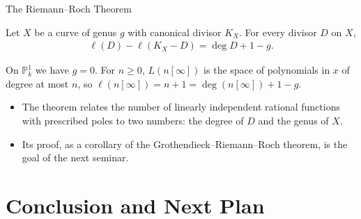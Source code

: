 \documentclass[10pt,aspectratio=1610]{beamer}
\newcommand{\PP}{\mathbb{P}}
\begin{document}
    \begin{frame}{The Riemann--Roch Theorem}
        \begin{theorem}
            Let $X$ be a curve of genus $g$ with canonical divisor $K_X$. For every divisor $D$ on $X$,
            \begin{align*}
                \ell(D) - \ell(K_X - D) = \deg D + 1 - g.
            \end{align*}
        \end{theorem}
        \begin{example}
            On $\PP^1_k$ we have $g = 0$. For $n \geq 0$, $L(n[\infty])$ is the space of polynomials in $x$ of degree at most $n$, so $\ell(n[\infty]) = n + 1 = \deg(n[\infty]) + 1 - g$.
        \end{example}
        \begin{itemize}
            \item The theorem relates the number of linearly independent rational functions with prescribed poles to two numbers: the degree of $D$ and the genus of $X$.
            \item Its proof, as a corollary of the Grothendieck--Riemann--Roch theorem, is the goal of the next seminar.
        \end{itemize}
    \end{frame}


    \section{Conclusion and Next Plan}
\end{document}

